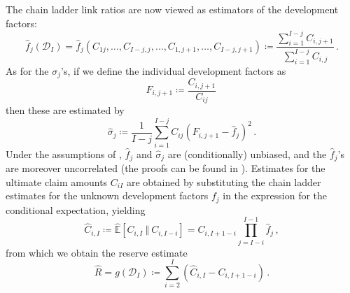 \documentclass[a4paper]{book}
\theoremstyle{plain}
\begin{document}
The chain ladder link ratios are now viewed as estimators of the development factors:
\begin{equation} \label{eq:cl-estimator}
    \hat{f}_j(\mathcal{D}_I) = \hat{f}_j(C_{1j}, \dots, C_{I - j, j}, \dots, C_{1, j + 1}, \dots, C_{I - j, j + 1}) \coloneqq \frac{\sum_{i=1}^{I - j} C_{i, j + 1}}{\sum_{i=1}^{I - j} C_{i, j}} \,.
\end{equation}
As for the $\sigma_j$'s, if we define the individual development factors as
\begin{equation}
    F_{i, j + 1} \coloneqq \frac{C_{i, j + 1}}{C_{ij}} \,
\end{equation}
then these are estimated by
\begin{equation}
    \hat{\sigma}_j \coloneqq \frac{1}{I-j}\sum_{i=1}^{I-j} C_{ij}\left( F_{i, j + 1} - \hat{f}_j \right)^2 \,.
\end{equation}
Under the assumptions of , $\hat{f}_j$ and $\hat{\sigma}_j$ are (conditionally) unbiased, and the $\hat{f}_j$'s are moreover uncorrelated (the proofs can be found in \cite[17 \psqq]{wuthrich:stochastic-reserving}). Estimates for the ultimate claim amounts $C_{iI}$ are obtained by substituting the chain ladder estimates for the unknown development factors $f_j$ in the expression for the conditional expectation, yielding
\begin{equation}
    \hat{C}_{i, I} \coloneqq \hat{\mathbb{E}}[C_{i, I} \ \Vert \ C_{i, I-i}] = C_{i, I + 1 - i} \prod_{j=I-i}^{I-1} \hat{f}_j  \,,
\end{equation}
from which we obtain the reserve estimate
\begin{equation} \label{eq:reserve-predictor}
    \hat{R} = g(\mathcal{D}_I) \coloneqq \sum_{i = 2}^I (\hat{C}_{i, I} - C_{i, I + 1- i}) \,. 
\end{equation}
\end{document}
